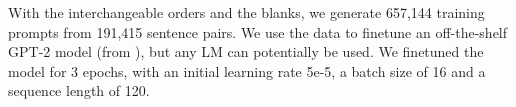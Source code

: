 
With the interchangeable orders and the blanks, we generate 657,144 training prompts from 191,415 sentence pairs.
We use the data to finetune an off-the-shelf GPT-2 model (from \citet{Wolf2019HuggingFacesTS}), but any LM can potentially be used.
We finetuned the model for 3 epochs, with an initial learning rate 5e-5, a batch size of 16 and a sequence length of 120.